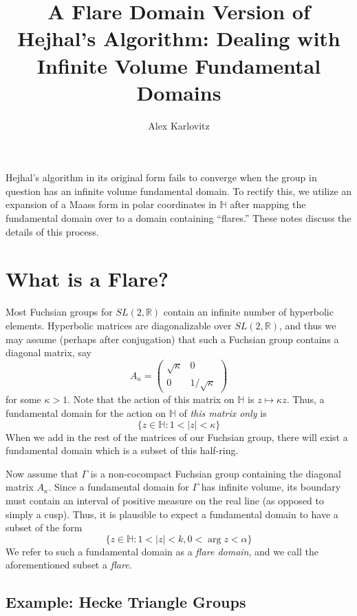 \documentclass[]{article}
\title{A Flare Domain Version of Hejhal's Algorithm: Dealing with Infinite Volume Fundamental Domains}
\author{Alex Karlovitz}
\date{}
\begin{document}
	
	\maketitle
	
Hejhal's algorithm in its original form fails to converge when the group in question has an infinite volume fundamental domain.
To rectify this, we utilize an expansion of a Maass form in polar coordinates in $\mathbb{H}$ after mapping the fundamental domain over to a domain containing ``flares.''
These notes discuss the details of this process.

\section*{What is a Flare?}

Most Fuchsian groups for $SL(2, \mathbb{R})$ contain an infinite number of hyperbolic elements.
Hyperbolic matrices are diagonalizable over $SL(2, \mathbb{R})$, and thus we may assume (perhaps after conjugation) that such a Fuchsian group contains a diagonal matrix, say
\[
A_\kappa =
\begin{pmatrix}
	\sqrt{\kappa} & 0 \\
	0 & 1/\sqrt{\kappa}
\end{pmatrix}
\]
for some $\kappa > 1$.
Note that the action of this matrix on $\mathbb{H}$ is $z \mapsto \kappa z$.
Thus, a fundamental domain for the action on $\mathbb{H}$ of \textit{this matrix only} is
$$
\{ z \in \mathbb{H} : 1 < |z| < \kappa \}
$$
When we add in the rest of the matrices of our Fuchsian group, there will exist a fundamental domain which is a subset of this half-ring.

Now assume that $\Gamma$ is a non-cocompact Fuchsian group containing the diagonal matrix $A_\kappa$.
Since a fundamental domain for $\Gamma$ has infinite volume, its boundary must contain an interval of positive measure on the real line (as opposed to simply a cusp).
Thus, it is plausible to expect a fundamental domain to have a subset of the form
$$
\{ z \in \mathbb{H} : 1 < |z| < k, 0 < \arg z < \alpha \}
$$
We refer to such a fundamental domain as a \textit{flare domain}, and we call the aforementioned subset a \textit{flare}.

\subsection*{Example: Hecke Triangle Groups}
\end{document}
